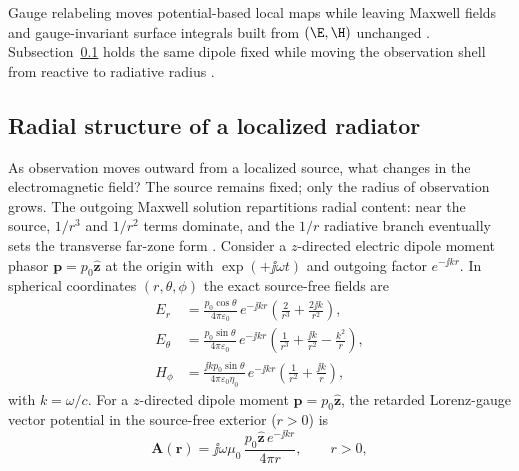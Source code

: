 Gauge relabeling moves potential-based local maps while leaving Maxwell fields and gauge-invariant surface integrals built from \((\E,\H)\) unchanged \cite{maxwell1873,belinfante1940}. Subsection~\ref{sec:ch01.6.4} holds the same dipole fixed while moving the observation shell from reactive to radiative radius \cite{stratton1941,chu1948}.
\subsection{Radial structure of a localized radiator}
\label{sec:ch01.6.4}

As observation moves outward from a localized source, what changes in the electromagnetic field? The source remains fixed; only the radius of observation grows. The outgoing Maxwell solution repartitions radial content: near the source, $1/r^3$ and $1/r^2$ terms dominate, and the $1/r$ radiative branch eventually sets the transverse far-zone form \cite{stratton1941,poynting1884}. Consider a $z$-directed electric dipole moment phasor $\mathbf{p}=p_0\hat{\mathbf{z}}$ at the origin with $\exp(+\jj\omega t)$ and outgoing factor $e^{-\jj kr}$. In spherical coordinates $(r,\theta,\phi)$ the exact source-free fields are \cite{stratton1941,harrington2001}
\begin{subequations}
\label{eq:ch1.dipole-fields-explicit}
\begin{align}
E_r&=\frac{p_0\cos\theta}{4\pi\varepsilon_0}\,e^{-\jj kr}
\left(\frac{2}{r^3}+\frac{2\jj k}{r^2}\right),
\label{eq:ch1.dipole-Er}\\[0.25em]
E_\theta&=\frac{p_0\sin\theta}{4\pi\varepsilon_0}\,e^{-\jj kr}
\left(\frac{1}{r^3}+\frac{\jj k}{r^2}-\frac{k^2}{r}\right),
\label{eq:ch1.dipole-Etheta}\\[0.25em]
H_\phi&=\frac{\jj k p_0\sin\theta}{4\pi\varepsilon_0\eta_0}\,e^{-\jj kr}
\left(\frac{1}{r^2}+\frac{\jj k}{r}\right),
\label{eq:ch1.dipole-Hphi}
\end{align}
\end{subequations}
with $k=\omega/c$. For a $z$-directed dipole moment $\mathbf{p}=p_0\hat{\mathbf{z}}$, the retarded Lorenz-gauge vector potential in the source-free exterior ($r>0$) is
\begin{equation}
\label{eq:ch1.dipole-A-retarded}
\mathbf{A}(\mathbf{r})=\jj\omega\mu_0\,\frac{p_0\hat{\mathbf{z}}\,e^{-\jj kr}}{4\pi r},
\qquad r>0,
\end{equation}
